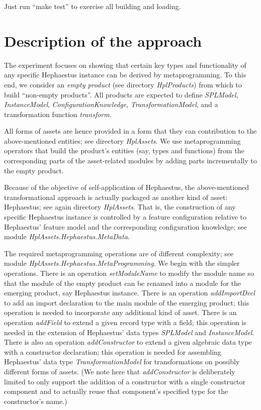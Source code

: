 \documentclass{article}
\begin{document}
Just run ``make test'' to exercise all building and loading.

\section{Description of the approach}

The experiment focuses on showing that certain key types and functionality of any specific Hephaestus instance can be derived by metaprogramming. To this end, we consider an \emph{empty product} (see directory \emph{HplProducts}) from which to build ``non-empty products''. All products are expected to define \emph{SPLModel}, \emph{InstanceModel}, \emph{ConfigurationKnowledge}, \emph{TransformationModel}, and a transformation function  \emph{transform}.

All forms of assets are hence provided in a form that they can contribution to the above-mentioned entities; see directory \emph{HplAssets}. We use metaprogramming operators that build the product's entities (say, types and functions) from the corresponding parts of the asset-related modules by adding parts incrementally to the empty product.

Because of the objective of self-application of Hephaestus, the above-mentioned transformational approach is actually packaged as another kind of asset: Hephaestus; see again directory \emph{HplAssets}. That is, the construction of
any specific Hephaestus instance is controlled by a feature configuration relative to Hephaestus' feature model and the corresponding configuration knowledge; see module \emph{HplAssets.Hephaestus.MetaData}.

The required metaprogramming operations are of different complexity; see module \emph{HplAssets.Hephaestus.MetaProgramming}. We begin with the simpler operations. There is an operation \emph{setModuleName} to modify the module name so that the module of the empty product can be renamed into a module for the emerging product, say Hephaestus instance. There is an operation \emph{addImportDecl} to add an import declaration to the main module of the emerging product; this operation is needed to incorporate any additional kind of asset. There is an operation \emph{addField} to extend a given record type with a field; this operation is needed in the extension of Hephaestus' data types \emph{SPLModel} and \emph{InstanceModel}.  There is also an operation \emph{addConstructor} to extend a given algebraic data type with a constructor declaration; this operation is needed for assembling Hephaestus' data type \emph{TransformationModel} for transformations on possibly different forms of assets. (We note here that \emph{addConstructor} is deliberately limited to only support the addition of a constructor with a single constructor component and to actually reuse that component's specified type for the constructor's name.)
\end{document}
